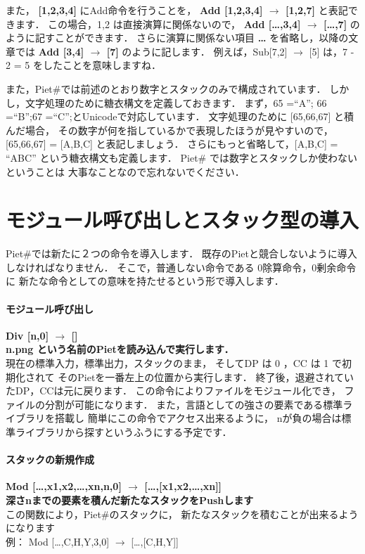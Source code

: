 また， \textbf{{[}1,2,3,4{]}} にAdd命令を行うことを， \textbf{Add
{[}1,2,3,4{]} $\to$ {[}1,2,7{]}} と表記できます． この場合，1,2
は直接演算に関係ないので， \textbf{Add {[}\ldots{},3,4{]} $\to$
{[}\ldots{},7{]}} のように記すことができます． さらに演算に関係ない項目
\textbf{\ldots{}} を省略し，以降の文章では \textbf{Add {[}3,4{]}
$\to$ {[}7{]}} のように記します． 例えば，Sub{[}7,2{]}
$\to$ {[}5{]} は，7 - 2 = 5 をしたことを意味しますね．

また，Piet\#では前述のとおり数字とスタックのみで構成されています．
しかし，文字処理のために糖衣構文を定義しておきます． まず，65 =``A''; 66
=``B'';67 =``C'';とUnicodeで対応しています． 文字処理のために
{[}65,66,67{]} と積んだ場合，
その数字が何を指しているかで表現したほうが見やすいので， {[}65,66,67{]} =
{[}A,B,C{]} と表記しましょう． さらにもっと省略して，{[}A,B,C{]} = ``ABC''
という糖衣構文も定義します． Piet\#
では数字とスタックしか使わないということは
大事なことなので忘れないでください．　　

\section{モジュール呼び出しとスタック型の導入}

Piet\#では新たに２つの命令を導入します．
既存のPietと競合しないように導入しなければなりません．
そこで，普通しない命令である 0除算命令，0剰余命令に
新たな命令としての意味を持たせるという形で導入します．

\paragraph{モジュール呼び出し}

\textbf{Div {[}n,0{]} $\to$ {[}{]}}\\\textbf{n.png
という名前のPietを読み込んで実行します．}\\現在の標準入力，標準出力，スタックのまま，
そしてDP は 0 ，CC は 1 で初期化されて
そのPietを一番左上の位置から実行します．
終了後，退避されていたDP，CCは元に戻ります．
この命令によりファイルをモジュール化でき，
ファイルの分割が可能になります．
また，言語としての強さの要素である標準ライブラリを搭載し
簡単にこの命令でアクセス出来るように，
nが負の場合は標準ライブラリから探すというふうにする予定です．

\paragraph{スタックの新規作成}

\textbf{Mod {[}\ldots{},x1,x2,\ldots{},xn,n,0{]} $\to$
{[}\ldots{},{[}x1,x2,\ldots{},xn{]}{]}}\\\textbf{深さnまでの要素を積んだ新たなスタックをPushします}\\この関数により，Piet\#のスタックに，
新たなスタックを積むことが出来るようになります\\例： Mod
{[}\ldots{},C,H,Y,3,0{]} $\to$ {[}\ldots{},{[}C,H,Y{]}{]}

